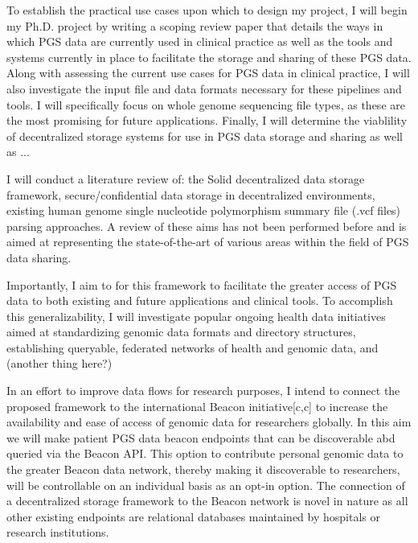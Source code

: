 \documentclass[11pt]{article}
\begin{document}
To establish the practical use cases upon which to design my project, I will begin my Ph.D. project by writing a scoping review paper that details the ways in which PGS data are currently used in clinical practice as well as the tools and systems currently in place to facilitate the storage and sharing of these PGS data. 
Along with assessing the current use cases for PGS data in clinical practice, I will also investigate the input file and data formats necessary for these pipelines and tools. I will specifically focus on whole genome sequencing file types, as these are the most promising for future applications. 
Finally, I will determine the viablility of decentralized storage systems for use in PGS data storage and sharing as well as ...

I will conduct a literature review of: the Solid decentralized data storage framework, secure/confidential data storage in decentralized environments, existing human genome single nucleotide polymorphism summary file (.vcf files) parsing approaches. A review of these aims has not been performed before and is aimed at representing the state-of-the-art of various areas within the field of PGS data sharing.

Importantly, I aim to for this framework to facilitate the greater access of PGS data to both existing and future applications and clinical tools. 
To accomplish this generalizability, I will investigate popular ongoing health data initiatives aimed at standardizing genomic data formats and directory structures, establishing queryable, federated networks of health and genomic data, and (another thing here?)

In an effort to improve data flows for research purposes, I intend to connect the proposed framework to the international Beacon initiative[c,c] to increase the availability and ease of access of genomic data for researchers globally. 
In this aim we will make patient PGS data beacon endpoints that can be discoverable abd queried via the Beacon API.
This option to contribute personal genomic data to the greater Beacon data network, thereby making it discoverable to researchers, will be controllable on an individual basis as an opt-in option. 
The connection of a decentralized storage framework to the Beacon network is novel in nature as all other existing endpoints are relational databases maintained by hospitals or research institutions.
\end{document}
